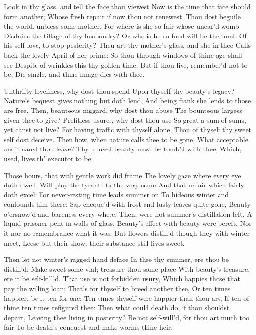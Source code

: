 \documentclass[twocolumn]{book}
\begin{document}
Look in thy glass, and tell the face thou viewest
Now is the time that face should form another;
Whose fresh repair if now thou not renewest,
Thou dost beguile the world, unbless some mother.
For where is she so fair whose unear'd womb
Disdains the tillage of thy husbandry?
Or who is he so fond will be the tomb
Of his self-love, to stop posterity?
Thou art thy mother's glass, and she in thee
Calls back the lovely April of her prime:
So thou through windows of thine age shall see
Despite of wrinkles this thy golden time.
  But if thou live, remember'd not to be,
  Die single, and thine image dies with thee.

Unthrifty loveliness, why dost thou spend
Upon thyself thy beauty's legacy?
Nature's bequest gives nothing but doth lend,
And being frank she lends to those are free.
Then, beauteous niggard, why dost thou abuse
The bounteous largess given thee to give?
Profitless usurer, why dost thou use
So great a sum of sums, yet canst not live?
For having traffic with thyself alone,
Thou of thyself thy sweet self dost deceive.
Then how, when nature calls thee to be gone,
What acceptable audit canst thou leave?
  Thy unused beauty must be tomb'd with thee,
  Which, used, lives th' executor to be.


Those hours, that with gentle work did frame
The lovely gaze where every eye doth dwell,
Will play the tyrants to the very same
And that unfair which fairly doth excel:
For never-resting time leads summer on
To hideous winter and confounds him there;
Sap cheque'd with frost and lusty leaves quite gone,
Beauty o'ersnow'd and bareness every where:
Then, were not summer's distillation left,
A liquid prisoner pent in walls of glass,
Beauty's effect with beauty were bereft,
Nor it nor no remembrance what it was:
  But flowers distill'd though they with winter meet,
  Leese but their show; their substance still lives sweet.


Then let not winter's ragged hand deface
In thee thy summer, ere thou be distill'd:
Make sweet some vial; treasure thou some place
With beauty's treasure, ere it be self-kill'd.
That use is not forbidden usury,
Which happies those that pay the willing loan;
That's for thyself to breed another thee,
Or ten times happier, be it ten for one;
Ten times thyself were happier than thou art,
If ten of thine ten times refigured thee:
Then what could death do, if thou shouldst depart,
Leaving thee living in posterity?
  Be not self-will'd, for thou art much too fair
  To be death's conquest and make worms thine heir.
\end{document}
